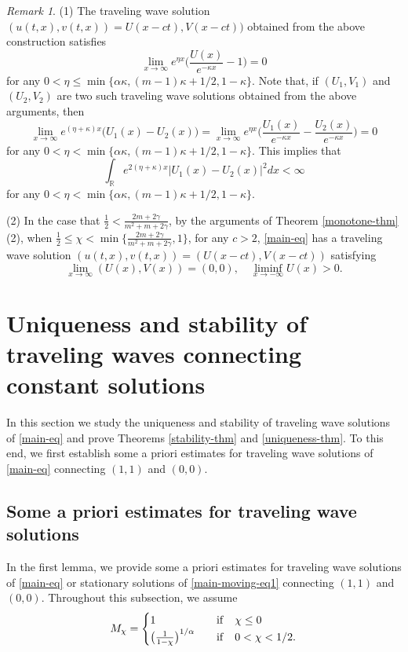 \documentclass[11pt]{article} %
\theoremstyle{remark}
\newtheorem{remark}{Remark}[section]
\theoremstyle{remark}
\numberwithin{equation}{section}
\numberwithin{figure}{section}
\numberwithin{table}{section}
\newcommand\RR{\ensuremath{\mathbb{R}}}
\begin{document}
\begin{remark}
\label{existence-rk}
(1) The traveling wave solution $(u(t,x),v(t,x))=U(x-ct),V(x-ct))$ obtained from the above construction satisfies
$$
\lim_{x\to \infty} e^{\eta x} \Big(\frac{U(x)}{e^{-\kappa x}}-1\Big)=0
$$
for any $0<\eta\le \min\{\alpha \kappa, (m-1)\kappa +1/2, 1-\kappa\}$. Note that, if  $(U_1,V_1)$ and $(U_2,V_2)$ are two such traveling wave solutions obtained from the above arguments, then
$$
\lim_{x\to \infty} e^{(\eta +\kappa)x} \big(U_1(x)-U_2(x)\big)=
\lim_{x\to \infty} e^{\eta x} \Big(\frac{U_1(x)}{e^{-\kappa x}}-\frac{U_2(x)}{e^{-\kappa x}}\Big)=0
$$
for  any $0<\eta< \min\{\alpha \kappa, (m-1)\kappa +1/2, 1-\kappa\}$.
This implies that
$$
\int_{\RR} e^{2(\eta+\kappa) x}|U_1(x)-U_2(x)|^2 dx<\infty
$$
for  any $0<\eta< \min\{\alpha \kappa, (m-1)\kappa +1/2, 1-\kappa\}$.

\smallskip

(2) In the case that $\frac{1}{2}<\frac{2m+2\gamma}{m^2+m+2\gamma}$,
by the arguments of Theorem \ref{monotone-thm}(2), when $\frac{1}{2}\le \chi<\min\{\frac{2m+2\gamma}{m^2+m+2\gamma},1\}$,  for any $c>2$, \eqref{main-eq} has a traveling wave solution
$(u(t,x),v(t,x))=(U(x-ct),V(x-ct))$ satisfying
$$
\lim_{x\to\infty} (U(x),V(x))=(0,0), \quad \liminf_{x\to -\infty} U(x)>0.
$$
\end{remark}

\section{Uniqueness and stability of traveling waves connecting constant solutions}
\label{uniqueness-stability-section}

In this section we study the uniqueness and stability of traveling wave solutions of \eqref{main-eq} and prove Theorems \ref{stability-thm} and \ref{uniqueness-thm}. To this end, we first establish some a priori  estimates for traveling wave solutions of \eqref{main-eq} connecting $(1,1)$ and $(0,0)$. 

\subsection{Some a priori estimates for traveling wave solutions}

In the first lemma, we provide  some a priori estimates  for traveling wave solutions of \eqref{main-eq} or  stationary solutions of
\eqref{main-moving-eq1} connecting $(1,1)$ and $(0,0)$.  Throughout this subsection, we assume 
$$M_\chi=\begin{cases} 1\quad  &\rm {if}\quad \chi\le 0\cr
\big(\frac{1}{1-\chi}\big)^{1/\alpha}\quad &{\rm  if}\quad  0<\chi<1/2.
\end{cases}
$$
\end{document}
